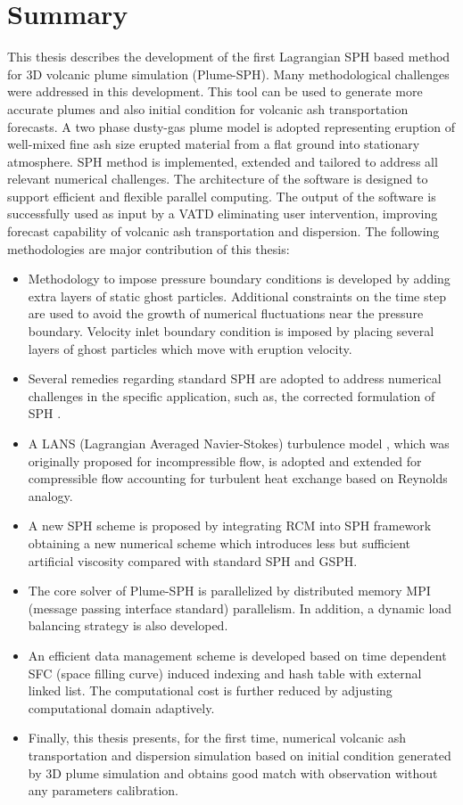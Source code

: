 \section{Summary}
This thesis describes  the development of the first Lagrangian SPH based method for 3D volcanic plume simulation  (Plume-SPH). Many methodological challenges were addressed in this development. This tool can be used to generate more accurate plumes and also initial condition for volcanic ash transportation forecasts. A two phase dusty-gas plume model is adopted representing eruption of well-mixed fine ash size erupted material from a flat ground into stationary atmosphere. SPH method is implemented, extended and tailored to address all relevant numerical challenges. The architecture of the software is designed to support efficient and flexible parallel computing. The output of the software is successfully used as input by a VATD eliminating user intervention, improving forecast capability of volcanic ash transportation and dispersion. The following methodologies are major contribution of this thesis:

\begin{itemize}
\item Methodology to impose pressure boundary conditions is developed by adding extra layers of static ghost particles. Additional constraints on the time step are used to avoid the growth of numerical fluctuations near the pressure boundary. Velocity inlet boundary condition is imposed by placing several layers of ghost particles which move with eruption velocity.
\item Several remedies regarding standard SPH are adopted to address numerical challenges in the specific application, such as, the corrected formulation of SPH \citep{chen1999improvement}.
\item  A LANS (Lagrangian Averaged Navier-Stokes) turbulence model \citep{monaghan2011turbulence}, which was originally proposed for incompressible flow, is adopted and extended for compressible flow accounting for turbulent heat exchange based on Reynolds analogy.
\item A new SPH scheme is proposed by integrating RCM into SPH framework obtaining a new numerical scheme which introduces less but sufficient artificial viscosity compared with standard SPH and GSPH.
\item The core solver of Plume-SPH is parallelized by distributed memory MPI (message passing interface standard) parallelism. In addition, a dynamic load balancing strategy is also developed. 
\item An efficient data management scheme is developed based on time dependent SFC (space filling curve) induced indexing and hash table with external linked list. The computational cost is further reduced by adjusting computational domain adaptively.
\item Finally, this thesis presents, for the first time, numerical volcanic ash transportation and dispersion simulation based on initial condition generated by 3D plume simulation and obtains good match with observation without any parameters calibration.
\end{itemize}

